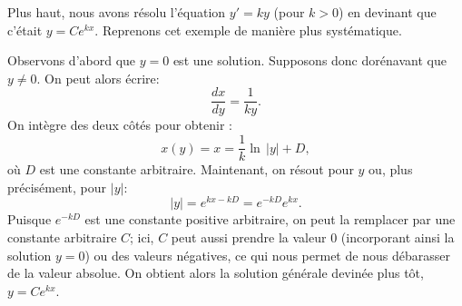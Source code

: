 \begin{example}
	Plus haut, nous avons résolu l'équation $y' = ky$ (pour $k > 0$) en devinant que c'était
	$y=Ce^{kx}$.  Reprenons cet exemple de manière plus systématique.

	Observons d'abord que  $y=0$ est une solution.  Supposons donc dorénavant que $y\not= 0$.
	On peut alors écrire:
	\begin{equation*}
		\frac{dx}{dy} = \frac{1}{ky} .
	\end{equation*}
	On intègre des deux côtés pour obtenir :
	\begin{equation*}
		x(y) = x = \frac{1}{k} \ln \, \lvert y\rvert  + D,
	\end{equation*}
	où $D$ est une constante arbitraire.
	Maintenant, on résout pour $y$ ou, plus précisément, pour $\lvert y \rvert$:
	\begin{equation*}
		\lvert y \rvert = e^{kx-kD} =  e^{-kD} e^{k x} .
	\end{equation*}
	Puisque $e^{-kD}$ est une constante positive arbitraire, on peut la remplacer par une constante arbitraire $C$;
	ici, $C$ peut aussi prendre la valeur 0 (incorporant ainsi la solution $y=0$) ou des valeurs négatives,
	ce qui nous permet de nous débarasser de la valeur absolue.  On obtient alors la solution générale devinée plus tôt, $y = Ce^{kx}$.
\end{example}

